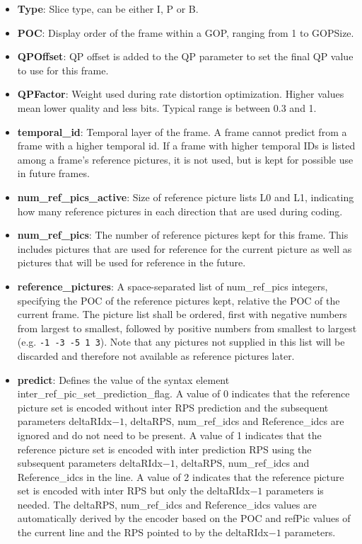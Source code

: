 \documentclass[a4paper,11pt]{jctvcdoc}
\begin{document}
\begin{itemize}
\item[]\textbf{Type}: Slice type, can be either I, P or B.

\item[]\textbf{POC}: Display order of the frame within a GOP, ranging
from 1 to GOPSize.

\item[]\textbf{QPOffset}: QP offset is added to the QP parameter to set
the final QP value to use for this frame.

\item[]\textbf{QPFactor}: Weight used during rate distortion
optimization. Higher values mean lower quality and less bits. Typical
range is between
0.3 and 1.

\item[]\textbf{temporal_id}: Temporal layer of the frame. A frame cannot
predict from a frame with a higher temporal id. If a frame with higher
temporal IDs is listed among a frame's reference pictures, it is
not used, but is kept for possible use in future frames.

\item[]\textbf{num_ref_pics_active}: Size of reference picture lists L0
and L1, indicating how many reference pictures in each direction that
are used during coding.

\item[]\textbf{num_ref_pics}: The number of reference pictures kept for
this frame.  This includes pictures that are used for reference for the
current picture as well as pictures that will be used for reference in
the future.

\item[]\textbf{reference_pictures}: A space-separated list of
num_ref_pics integers, specifying the POC of the reference pictures
kept, relative the POC of the current frame. The picture list shall be
ordered, first with negative numbers from largest to smallest, followed
by positive numbers from smallest to largest (e.g. \verb|-1 -3 -5 1 3|).
Note that any pictures not supplied in this list will be discarded and
therefore not available as reference pictures later.

\item[]\textbf{predict}: Defines the value of the syntax element
inter_ref_pic_set_prediction_flag. A value of 0 indicates that the
reference picture set is encoded without inter RPS prediction and the
subsequent parameters deltaRIdx$-1$, deltaRPS, num_ref_idcs and
Reference_idcs are ignored and do not need to be present. A value of 1
indicates that the reference picture set is encoded with inter
prediction RPS using the subsequent parameters deltaRIdx$-1$, deltaRPS,
num_ref_idcs and Reference_idcs in the line. A value of 2 indicates that
the reference picture set is encoded with inter RPS but only the
deltaRIdx$-1$ parameters is needed. The deltaRPS, num_ref_idcs and
Reference_idcs values are automatically derived by the encoder based on
the POC and refPic values of the current line and the RPS pointed to by
the deltaRIdx$-1$ parameters.


\end{itemize}
\end{document}
